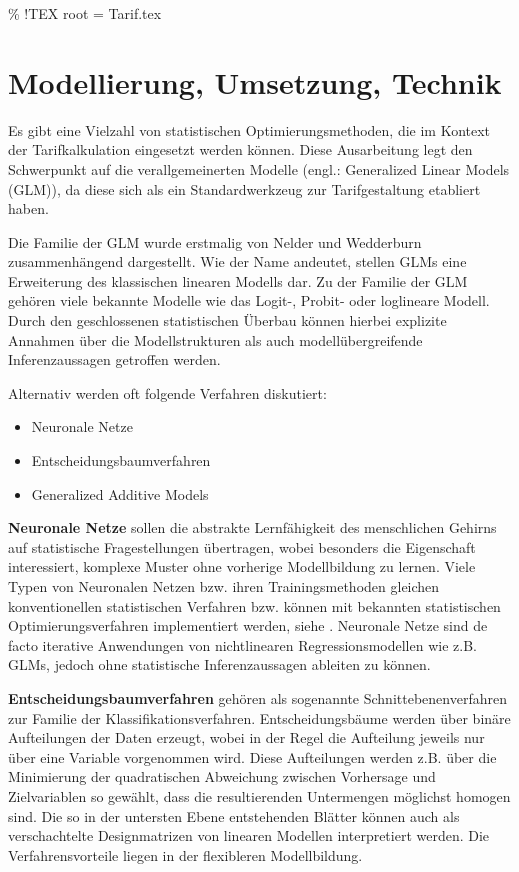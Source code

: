 \% !TEX root = Tarif.tex

\chapter{Modellierung, Umsetzung, Technik} \label{technik}

Es gibt eine Vielzahl von statistischen Optimierungsmethoden, die im Kontext der Tarifkalkulation eingesetzt werden können. Diese Ausarbeitung legt den Schwerpunkt auf die verallgemeinerten Modelle (engl.: Generalized Linear Models (GLM)), da diese sich als ein Standardwerkzeug zur Tarifgestaltung etabliert haben.

Die Familie der GLM  wurde erstmalig von Nelder und Wedderburn \cite{Nelder} zusammenhängend dargestellt. Wie der Name andeutet, stellen GLMs eine Erweiterung des klassischen linearen Modells dar. Zu der Familie der GLM gehören viele bekannte Modelle wie das Logit-, Probit- oder loglineare Modell. Durch den geschlossenen statistischen Überbau können hierbei explizite Annahmen über die Modellstrukturen als auch modellübergreifende Inferenzaussagen getroffen werden.

Alternativ werden oft folgende Verfahren diskutiert:

\begin{itemize}
\item Neuronale Netze
\item Entscheidungsbaumverfahren
\item Generalized Additive Models
\end{itemize}

\textbf{Neuronale Netze} sollen die abstrakte Lernfähigkeit des menschlichen Gehirns auf statistische Fragestellungen übertragen, wobei besonders die Eigenschaft interessiert, komplexe Muster ohne vorherige Modellbildung zu lernen.
Viele Typen von Neuronalen Netzen bzw. ihren Trainingsmethoden gleichen konventionellen statistischen Verfahren bzw. können mit bekannten statistischen Optimierungsverfahren implementiert werden, siehe \cite{Sarle}. Neuronale Netze sind de facto iterative Anwendungen von nichtlinearen Regressionsmodellen wie z.B. GLMs, jedoch ohne statistische Inferenzaussagen ableiten zu können.

\textbf{Entscheidungsbaumverfahren} gehören als sogenannte Schnittebenenverfahren zur Familie der Klassifikationsverfahren. Entscheidungsbäume werden über binäre Aufteilungen der Daten erzeugt, wobei in der Regel die Aufteilung jeweils nur über eine Variable vorgenommen wird. Diese Aufteilungen werden z.B. über die Minimierung der quadratischen Abweichung zwischen Vorhersage und Zielvariablen so gewählt, dass die resultierenden Untermengen möglichst homogen sind.
Die so in der untersten Ebene entstehenden Blätter können auch als verschachtelte Designmatrizen von linearen Modellen interpretiert werden. Die Verfahrensvorteile liegen in der flexibleren Modellbildung.

